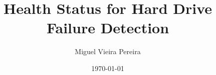 \documentclass[
    numbers=noenddot,
    parskip=half-,
    fontsize=12pt,
    paper=a4,
    oneside,
    titlepage,
    bibliography=totoc,
    chapterprefix=false,
]{scrbook}
\title{Health Status for Hard Drive Failure Detection}
\author{Miguel Vieira Pereira}
\date{\today}
\begin{document}
\frontmatter


\tableofcontents
\newpage


\newpage

% 

\thispagestyle{empty}
\cleardoublepage
\listoffigures
\newpage

\thispagestyle{empty}
\cleardoublepage
\listoftables
\newpage

\mainmatter








\begin{appendices}
    
\end{appendices}
\newpage


\backmatter

\printbibliography


\end{document}
